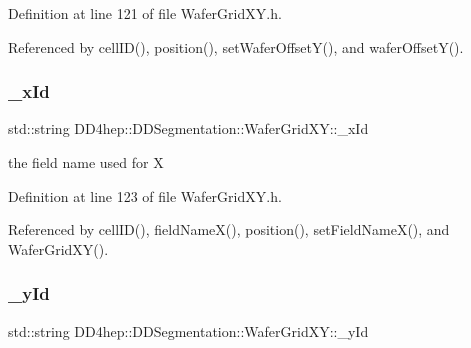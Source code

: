 Definition at line 121 of file Wafer\+Grid\+X\+Y.\+h.



Referenced by cell\+I\+D(), position(), set\+Wafer\+Offset\+Y(), and wafer\+Offset\+Y().

\hypertarget{class_d_d4hep_1_1_d_d_segmentation_1_1_wafer_grid_x_y_ac90f589f06ac860a0015e6a5e46b081b}{}\label{class_d_d4hep_1_1_d_d_segmentation_1_1_wafer_grid_x_y_ac90f589f06ac860a0015e6a5e46b081b} 
\subsubsection{\texorpdfstring{\+\_\+x\+Id}{\_xId}}
{\footnotesize\ttfamily std\+::string D\+D4hep\+::\+D\+D\+Segmentation\+::\+Wafer\+Grid\+X\+Y\+::\+\_\+x\+Id\hspace{0.3cm}{\ttfamily [protected]}}



the field name used for X 



Definition at line 123 of file Wafer\+Grid\+X\+Y.\+h.



Referenced by cell\+I\+D(), field\+Name\+X(), position(), set\+Field\+Name\+X(), and Wafer\+Grid\+X\+Y().

\hypertarget{class_d_d4hep_1_1_d_d_segmentation_1_1_wafer_grid_x_y_ac81f2246c4f13a9299036aab012d5887}{}\label{class_d_d4hep_1_1_d_d_segmentation_1_1_wafer_grid_x_y_ac81f2246c4f13a9299036aab012d5887} 
\subsubsection{\texorpdfstring{\+\_\+y\+Id}{\_yId}}
{\footnotesize\ttfamily std\+::string D\+D4hep\+::\+D\+D\+Segmentation\+::\+Wafer\+Grid\+X\+Y\+::\+\_\+y\+Id\hspace{0.3cm}{\ttfamily [protected]}}



